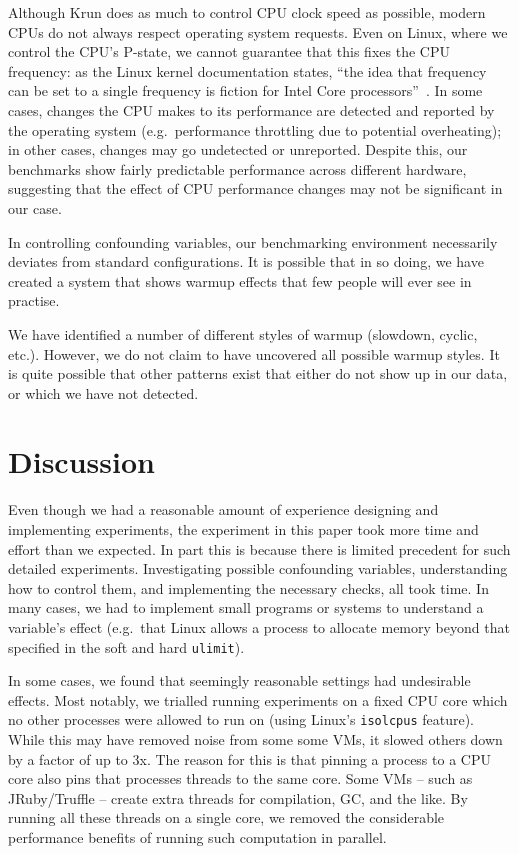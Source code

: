 \documentclass[a4paper,UKenglish]{lipics}
\newcommand{\krun}{Krun\xspace}
\begin{document}
Although \krun does as much to control CPU clock speed as possible, modern CPUs
do not always respect operating system requests. Even on Linux, where we control
the CPU's P-state, we cannot guarantee that this fixes the CPU frequency: as
the Linux kernel documentation states, ``the idea that frequency can be set to a single
frequency is fiction for Intel Core processors''~\cite{pstate}. In
some cases, changes the CPU makes to its performance are detected and reported
by the operating system (e.g.~performance throttling due to potential
overheating); in other cases, changes may go undetected or unreported.
Despite this, our benchmarks show fairly predictable performance across
different hardware, suggesting that the effect of CPU performance changes may
not be significant in our case.

In controlling confounding variables, our benchmarking environment necessarily
deviates from standard configurations. It is possible that in so doing, we have
created a system that shows warmup effects that few people will ever see in
practise.

We have identified a number of different styles of warmup (slowdown, cyclic,
etc.). However, we do not claim to have uncovered all possible warmup styles. It
is quite possible that other patterns exist that either do not show up in our
data, or which we have not detected.


\section{Discussion}
\label{sec:Discussion}

Even though we had a reasonable amount of experience designing and implementing
experiments, the experiment in this paper took more time and effort than we
expected. In part this is because there is limited precedent for such detailed
experiments. Investigating possible confounding variables, understanding how to
control them, and implementing the necessary checks, all took time. In many
cases, we had to implement small programs or systems to understand a variable's
effect (e.g.~that Linux allows a process to allocate memory beyond that
specified in the soft and hard \texttt{ulimit}).

In some cases, we found that seemingly reasonable settings had undesirable
effects. Most notably, we trialled running experiments on a fixed CPU core which
no other processes were allowed to run on (using Linux's \texttt{isolcpus}
feature). While this may have removed noise from some some VMs,
it slowed others down by
a factor of up to 3x. The reason for this is that pinning a process to a CPU
core also pins that processes threads to the same core. Some VMs -- such as
JRuby/Truffle -- create extra threads for compilation, GC, and the like. By
running all these threads on a single core, we removed the considerable
performance benefits of running such computation in parallel.
\end{document}
